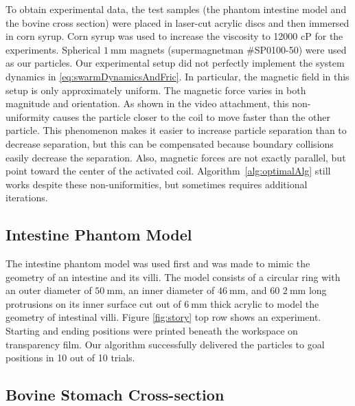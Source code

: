 To obtain experimental data, the test samples (the phantom intestine model and the bovine cross section) were placed in laser-cut acrylic discs and then immersed in corn syrup. Corn syrup was used to increase the viscosity to 12000 cP for the experiments. Spherical $\SI{1}{\milli\metre}$ magnets (supermagnetman \#SP0100-50) were used as our particles. Our experimental setup did not perfectly implement the system dynamics in \eqref{eq:swarmDynamicsAndFric}. In particular, the magnetic field in this setup is only approximately uniform. The magnetic force varies in both magnitude and orientation. As shown in the video attachment, this non-uniformity causes the particle closer to the coil to move faster than the other particle. This phenomenon makes it easier to increase particle separation than to decrease separation, but this can be compensated because boundary collisions easily decrease the separation. Also, magnetic forces are not exactly parallel, but point toward the center of the activated coil. Algorithm~\ref{alg:optimalAlg} still works despite these non-uniformities, but sometimes requires additional iterations.
 


\subsection{Intestine Phantom Model}

The intestine phantom model was used first and was made to mimic the geometry of an intestine and its villi. The model consists of a circular ring with an outer diameter of $\SI{50}{\milli\metre}$, an inner diameter of $\SI{46}{\milli\metre}$, and 60 $\SI{2}{\milli\metre}$ long protrusions on its inner surface cut out of $\SI{6}{\milli\metre}$ thick acrylic to model the geometry of intestinal villi. Figure \ref{fig:story} top row shows an experiment. Starting and ending positions were printed beneath the workspace on transparency film. Our algorithm successfully delivered the particles to goal positions in 10 out of 10 trials.





\subsection{Bovine Stomach Cross-section}

